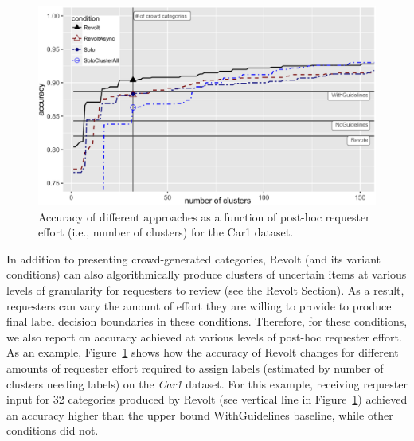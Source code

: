 \begin{figure}[ht]
	\centering
	\includegraphics[width=0.7\columnwidth]{Chapters/Revolt/figures/curveR2.png}
	\caption[Accuracy of different approaches as a function of post-hoc requester effort.]{
	Accuracy of different approaches as a function of post-hoc requester effort (i.e., number of clusters) for the Car1 dataset. 
	}
	\label{fig:curve}
\end{figure}


In addition to presenting crowd-generated categories, Revolt (and its variant conditions) can also algorithmically produce clusters of uncertain items at various levels of granularity for requesters to review (see the Revolt Section). As a result, requesters can vary the amount of effort they are willing to provide to produce final label decision boundaries in these conditions. Therefore, for these conditions, we also report on accuracy achieved at various levels of post-hoc requester effort. As an example, Figure~\ref{fig:curve} shows how the accuracy of Revolt changes for different amounts of requester effort required to assign labels (estimated by number of clusters needing labels) on the \emph{Car1} dataset. For this example, receiving requester input for 32 categories produced by Revolt (see vertical line in Figure~\ref{fig:curve}) achieved an accuracy higher than the upper bound WithGuidelines baseline, while other conditions did not. 

